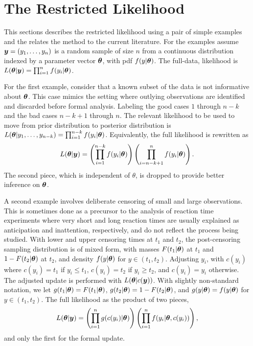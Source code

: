 \documentclass[11pt]{article}
\def\bth{\mbox{\boldmath $\theta$}}
\newcommand{\by}{\mbox{\boldmath $y$}}
\begin{document}
\section{The Restricted Likelihood}
\label{restrictedlikelihood}

This sections describes the restricted likelihood using a pair of simple examples and the relates the method to the current literature. For the examples assume $\by=(y_1,\ldots,y_n)$ is a random sample
of size $n$ from a continuous distribution indexed by a parameter
vector $\bth$, with pdf $f(y| \bth)$.  The full-data, likelihood is $L(\bth | \by) = \prod_{i=1}^n f(y_i | \bth)$.  

For the first example, consider that a known subset of the data is not informative about $\bth$.  This case mimics the setting where outlying observations  are identified and discarded before formal analysis. 
Labeling the good cases $1$ through $n-k$ and the bad cases $n-k+1$ through $n$.  
The relevant likelihood to be used to move from prior distribution to posterior distribution is 
$L(\bth | y_1, \ldots, y_{n-k}) = \prod_{i=1}^{n-k} f(y_i | \bth)$.  
Equivalently,  the full 
likelihood is rewritten as 
\begin{eqnarray}
\label{OutlyingCases}
L(\bth | \by)  
= \left( \prod_{i=1}^{n-k} f(y_i | \bth) \right) \left( \prod_{i=n-k+1}^{n} f(y_i | \bth) \right) .  
\end{eqnarray}
The second piece, which is independent of $\theta$,  is dropped to provide better inference on $\bth$.  

A second example involves deliberate censoring of small and large observations.  This is
sometimes done as a precursor to the analysis of reaction time
experiments  \citep[e.g.,][]{ratcliff1993} where very short and long reaction times are usually explained as anticipation and inattention, respectively, and do not reflect the process being studied.
With lower and upper censoring times at $t_1$ and $t_2$, the post-censoring sampling distribution
is of mixed form, with masses $F(t_1|\bth)$ at $t_1$ and $1-F(t_2|\bth)$ at $t_2$,
and density $f(y | \bth)$ for $y \in (t_1, t_2)$.  Adjusting $y_i$,
with $c(y_i)$ where $c(y_i)= t_1$ if $y_i \leq t_1$, $c(y_i)=t_2$ 
if $y_i \geq t_2$, and $c(y_i)=y_i$ otherwise.  
The adjusted update is performed with $L(\bth |c(\by))$.  
With slightly non-standard notation, we let $g(t_1|\bth) = F(t_1|\bth)$,
$g(t_2 | \bth) = 1 - F(t_2|\bth)$, and $g(y|\bth)=f(y|\bth)$ for
$y \in (t_1, t_2)$. The full likelihood as the product of two pieces, 
\begin{eqnarray}
\label{Censoring}
L(\bth | \by) =  \left( \prod_{i=1}^n g(c(y_i)  | \bth) \right) \left( \prod_{i=1}^n f(y_i|\bth,c(y_i) ) \right) ,  
\end{eqnarray}
and only the first for the formal update.  
\end{document}
